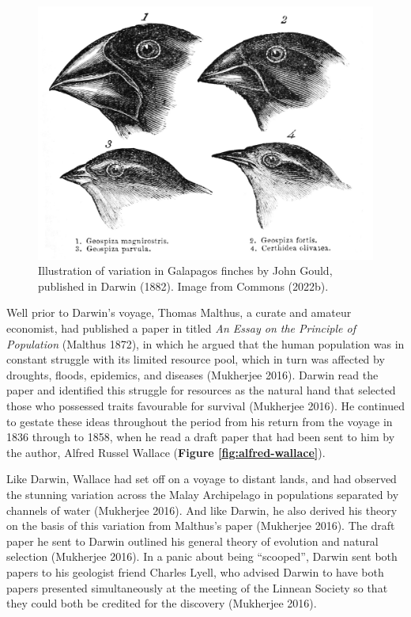 \documentclass[
]{book}
\begin{document}
\begin{figure}

\includegraphics[width=1\linewidth]{figs/introduction/Darwin's_finches_by_Gould} \hfill{}

\caption{Illustration of variation in Galapagos finches by John Gould, published in Darwin (1882). Image from Commons (2022b).}\label{fig:darwin-finches}
\end{figure}

Well prior to Darwin's voyage, Thomas Malthus, a curate and amateur economist, had published a paper in titled \emph{An Essay on the Principle of Population} (Malthus 1872), in which he argued that the human population was in constant struggle with its limited resource pool, which in turn was affected by droughts, floods, epidemics, and diseases (Mukherjee 2016). Darwin read the paper and identified this struggle for resources as the natural hand that selected those who possessed traits favourable for survival (Mukherjee 2016). He continued to gestate these ideas throughout the period from his return from the voyage in 1836 through to 1858, when he read a draft paper that had been sent to him by the author, Alfred Russel Wallace (\textbf{Figure \ref{fig:alfred-wallace}}).

Like Darwin, Wallace had set off on a voyage to distant lands, and had observed the stunning variation across the Malay Archipelago in populations separated by channels of water (Mukherjee 2016). And like Darwin, he also derived his theory on the basis of this variation from Malthus's paper (Mukherjee 2016). The draft paper he sent to Darwin outlined his general theory of evolution and natural selection (Mukherjee 2016). In a panic about being ``scooped'', Darwin sent both papers to his geologist friend Charles Lyell, who advised Darwin to have both papers presented simultaneously at the meeting of the Linnean Society so that they could both be credited for the discovery (Mukherjee 2016).
\end{document}
